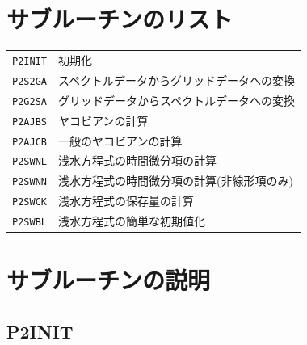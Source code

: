 \documentclass[a4j,fleqn]{jarticle}
\begin{document}
\section{サブルーチンのリスト}

\vspace{1em}
\begin{tabular}{ll}
{\tt P2INIT} & 初期化\\
{\tt P2S2GA} & スペクトルデータからグリッドデータへの変換\\
{\tt P2G2SA} & グリッドデータからスペクトルデータへの変換\\
{\tt P2AJBS} & ヤコビアンの計算\\
{\tt P2AJCB} & 一般のヤコビアンの計算\\
{\tt P2SWNL} & 浅水方程式の時間微分項の計算\\
{\tt P2SWNN} & 浅水方程式の時間微分項の計算(非線形項のみ)\\
{\tt P2SWCK} & 浅水方程式の保存量の計算\\
{\tt P2SWBL} & 浅水方程式の簡単な初期値化
\end{tabular}


\section{サブルーチンの説明}

\subsection{P2INIT}
\end{document}

